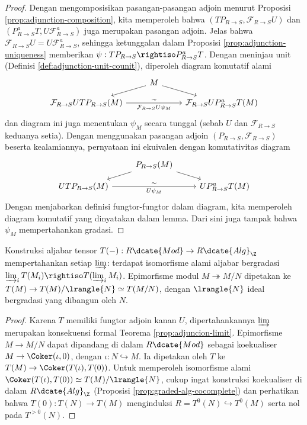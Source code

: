 \begin{proof}
	Dengan mengomposisikan pasangan-pasangan adjoin menurut Proposisi \ref{prop:adjunction-composition}, kita memperoleh bahwa $(T P_{R \to S}, \mathcal{F}_{R \to S} U)$ dan $(P_{R \to S}^a T, U \mathcal{F}_{R \to S}^a)$ juga merupakan pasangan adjoin. Jelas bahwa $\mathcal{F}_{R \to S} U = U \mathcal{F}_{R \to S}^a$, sehingga ketunggalan dalam Proposisi \ref{prop:adjunction-uniqueness} memberikan $\psi: TP_{R \to S} \rightiso P_{R \to S}^a T$. Dengan meninjau unit (Definisi \ref{def:adjunction-unit-counit}), diperoleh diagram komutatif alami
	\[\begin{tikzcd}[row sep=small]
		{} & M \arrow[ld] \arrow[rd] & \\
		\mathcal{F}_{R \to S} U T P_{R \to S} (M) \arrow[rr, "\sim", "{\mathcal{F}_{R \to S}U \psi_M}"'] & & \mathcal{F}_{R \to S} U P_{R \to S}^a T(M)
	\end{tikzcd}\]
	dan diagram ini juga menentukan $\psi_M$ secara tunggal (sebab $U$ dan $\mathcal{F}_{R \to S}$ keduanya setia). Dengan menggunakan pasangan adjoin $(P_{R \to S}, \mathcal{F}_{R \to S})$ beserta kealamiannya, pernyataan ini ekuivalen dengan komutativitas diagram
	\[\begin{tikzcd}[row sep=small]
		{} & P_{R \to S}(M) \arrow[ld] \arrow[rd] & \\
		U T P_{R \to S} (M) \arrow[rr, "\sim", "{U \psi_M}"'] & & U P_{R \to S}^a T(M)
	\end{tikzcd}\]
	Dengan menjabarkan definisi fungtor-fungtor dalam diagram, kita memperoleh diagram komutatif yang dinyatakan dalam lemma. Dari sini juga tampak bahwa $\psi_M$ mempertahankan gradasi.
\end{proof}

\begin{corollary}\label{prop:tensor-alg-limit}
	Konstruksi aljabar tensor $T(-): R\dcate{Mod} \to R\dcate{Alg}_{\Z}$ mempertahankan setiap $\varinjlim$: terdapat isomorfisme alami aljabar bergradasi $\varinjlim_i T(M_i) \rightiso T(\varinjlim_i M_i)$. Epimorfisme modul $M \twoheadrightarrow M/N$ dipetakan ke $T(M) \to T(M)/\lrangle{N} \simeq T(M/N)$, dengan $\lrangle{N}$ ideal bergradasi yang dibangun oleh $N$.
\end{corollary}
\begin{proof}
	Karena $T$ memiliki fungtor adjoin kanan $U$, dipertahankannya $\varinjlim$ merupakan konsekuensi formal Teorema \ref{prop:adjuncion-limit}. Epimorfisme $M \to M/N$ dapat dipandang di dalam $R\dcate{Mod}$ sebagai koekualiser $M \to \Coker(\iota,0)$, dengan $\iota: N \hookrightarrow M$. Ia dipetakan oleh $T$ ke $T(M) \to \Coker(T(\iota), T(0))$. Untuk memperoleh isomorfisme alami $\Coker(T(\iota), T(0)) \simeq T(M)/\lrangle{N}$, cukup ingat konstruksi koekualiser di dalam $R\dcate{Alg}_{\Z}$ (Proposisi \ref{prop:graded-alg-cocomplete}) dan perhatikan bahwa $T(0): T(N) \to T(M)$ menginduksi $R = T^0(N) \hookrightarrow T^0(M)$ serta nol pada $T^{>0}(N)$.
\end{proof}

